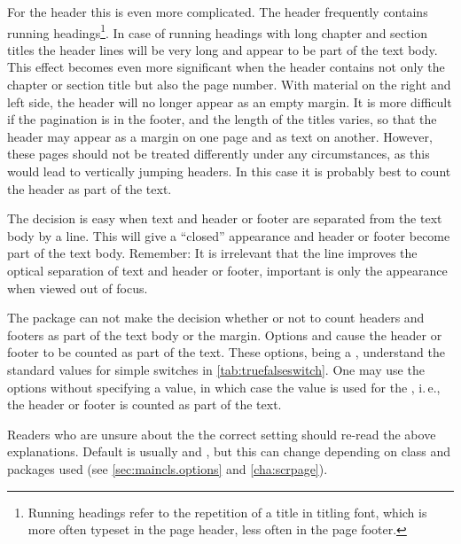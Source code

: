 \begin{Explain}
  For the header this is even more complicated. The header frequently
  contains running headings\footnote{Running headings refer to the repetition of a
    title in titling font, which is more often typeset in the page
    header, less often in the page footer.}.  In case of running
  headings with long chapter and section titles the header lines will
  be very long and appear to be part of the text body.  This effect
  becomes even more significant when the header contains not only the
  chapter or section title but also the page number. With material on
  the right and left side, the header will no longer appear as an
  empty margin. It is more difficult if the pagination is in the
  footer, and the length of the titles varies, so that the header may
  appear as a margin on one page and as text on another.  However,
  these pages should not be treated differently under any
  circumstances, as this would lead to vertically jumping headers. In
  this case it is probably best to count the header as part of the
  text.

  The decision is easy when text and header or footer are separated
  from the text body by a line. This will give a ``closed'' appearance
  and header or footer become part of the text body.  Remember: It is
  irrelevant that the line improves the optical separation of text and
  header or footer, important is only the appearance when viewed out
  of focus.
\end{Explain}

The  package can not make the decision whether or
not to count headers and footers as part of the text body or the
margin. Options  and  cause
the header or footer to be counted as part of the text.  These
options, being a ,
understand the standard values for simple switches in
\autoref{tab:truefalseswitch}. One may use the options without
specifying a value, in which case the value  is used for
the , i.\,e., the header or footer is counted as part of
the text.

Readers who are unsure about the the correct setting should re-read
the above explanations. Default is usually
 and ,
but this can change depending on {\KOMAScript} class and {\KOMAScript}
packages used (see \autoref{sec:maincls.options} and
\autoref{cha:scrpage}).

